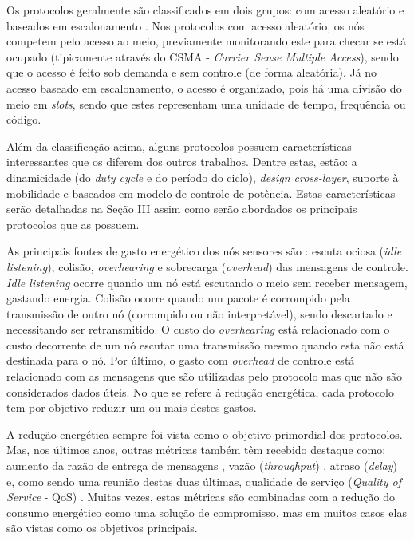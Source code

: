 \documentclass[12pt]{article}
\begin{document}
  Os protocolos geralmente são classificados em dois grupos: com acesso aleatório e baseados em escalonamento \cite{kredo07}. Nos protocolos com acesso aleatório, os nós competem pelo acesso ao meio, previamente monitorando este para checar se está ocupado (tipicamente através do CSMA - \emph{Carrier Sense Multiple Access}), sendo que o acesso é feito sob demanda e sem controle (de forma aleatória). Já no acesso baseado em escalonamento, o acesso é organizado, pois há uma divisão do meio em \emph{slots}, sendo que estes representam uma unidade de tempo, frequência ou código.

  Além da classificação acima, alguns protocolos possuem características interessantes que os diferem dos outros trabalhos. Dentre estas, estão: a dinamicidade (do \textit{duty cycle} e do período do ciclo), \textit{design cross-layer}, suporte à mobilidade e baseados em modelo de controle de potência. Estas características serão detalhadas na Seção III assim como serão abordados os principais protocolos que as possuem.

  As principais fontes de gasto energético dos nós sensores são \cite{20100812725891}: escuta ociosa (\textit{idle listening}), colisão, \textit{overhearing} e sobrecarga (\textit{overhead}) das mensagens de controle. 
\emph{Idle listening} ocorre quando um nó está escutando o meio sem receber mensagem, gastando energia. Colisão ocorre quando um pacote é corrompido pela transmissão de outro nó (corrompido ou não interpretável), sendo descartado e necessitando ser retransmitido. 
O custo do \emph{overhearing} está relacionado com o custo decorrente de um nó escutar uma transmissão mesmo quando esta não está destinada para o nó. Por último, o gasto com \emph{overhead} de controle está relacionado com as mensagens que são utilizadas pelo protocolo mas que não são considerados dados úteis.
No que se refere à redução energética, cada protocolo tem por objetivo reduzir um ou mais destes gastos.

  A redução energética sempre foi vista como o objetivo primordial dos protocolos. Mas, nos últimos anos, outras métricas também têm recebido destaque como: aumento da razão de entrega de mensagens \cite{20094112365200}, vazão (\textit{throughput}) \cite{20073110720913, 20103813240679, 20102613044996, 20100312645920, 20094212373426, 20083911592812}, atraso (\textit{delay}) \cite{20102613044996, 20102813064978, 20100312645920, Yadav08, 20101312811704} e, como sendo uma reunião destas duas últimas, qualidade de serviço (\textit{Quality of Service} - QoS) \cite{20064010146973, 20102613043092, 20093112234782, 20093812310364, 20083811560517, 20083811569004, 20092612148942}. Muitas vezes, estas métricas são combinadas com a redução do consumo energético como uma solução de compromisso, mas em muitos casos elas são vistas como os objetivos principais.
\end{document}
